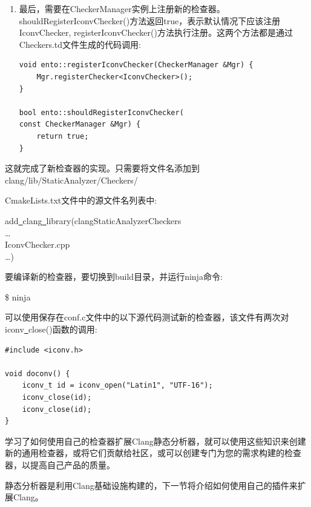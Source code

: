 \begin{enumerate}
\item 最后，需要在CheckerManager实例上注册新的检查器。shouldRegisterIconvChecker()方法返回true，表示默认情况下应该注册IconvChecker, registerIconvChecker()方法执行注册。这两个方法都是通过Checkers.td文件生成的代码调用:
\begin{lstlisting}[caption={}]
void ento::registerIconvChecker(CheckerManager &Mgr) {
	Mgr.registerChecker<IconvChecker>();
}

bool ento::shouldRegisterIconvChecker(
const CheckerManager &Mgr) {
	return true;
}
\end{lstlisting}

\end{enumerate}

这就完成了新检查器的实现。只需要将文件名添加到clang/lib/StaticAnalyzer/Checkers/\par CmakeLists.txt文件中的源文件名列表中:\par

\begin{tcolorbox}[colback=white,colframe=black]
add\underline{~}clang\underline{~}library(clangStaticAnalyzerCheckers \\
… \\
\hspace*{0.5cm}IconvChecker.cpp \\
…)
\end{tcolorbox}

要编译新的检查器，要切换到build目录，并运行ninja命令:\par

\begin{tcolorbox}[colback=white,colframe=black]
\$ ninja
\end{tcolorbox}

可以使用保存在conf.c文件中的以下源代码测试新的检查器，该文件有两次对iconv\underline{~}close()函数的调用:\par

\begin{lstlisting}[caption={}]
#include <iconv.h>

void doconv() {
	iconv_t id = iconv_open("Latin1", "UTF-16");
	iconv_close(id);
	iconv_close(id);
}
\end{lstlisting}

学习了如何使用自己的检查器扩展Clang静态分析器，就可以使用这些知识来创建新的通用检查器，或将它们贡献给社区，或可以创建专门为您的需求构建的检查器，以提高自己产品的质量。 \par

静态分析器是利用Clang基础设施构建的，下一节将介绍如何使用自己的插件来扩展Clang。\par
















